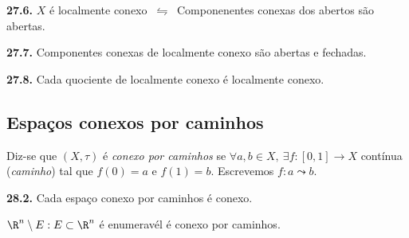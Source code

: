 \begin{proposition}
    \textbf{27.6.} \(X\) é localmente conexo \(\ \leftrightharpoons \ \) Componenentes conexas dos abertos são abertas. %
\end{proposition}


\begin{corollary}
    \textbf{27.7.} Componentes conexas de localmente conexo são abertas e fechadas. 
\end{corollary}

\begin{proposition}
    \textbf{27.8.} Cada quociente de localmente conexo é localmente conexo. 
\end{proposition}


\subsection*{Espaços conexos por caminhos}

\begin{definition}
    Diz-se que \((X,\tau)\) é \emph{conexo por caminhos} se \(\forall a, b \in X, \ \exists f: [0,1] \to X\) contínua (\emph{caminho})  tal que \(f(0) = a\) e \(f(1) = b \). Escrevemos \(f: a \leadsto b\).  
\end{definition}

\begin{proposition}
    \textbf{28.2.} Cada espaço conexo por caminhos é conexo. 
\end{proposition}

\begin{example}
    \(\R^n \setminus E : E \subset \R^n\) é enumeravél é conexo por caminhos. 
\end{example}

